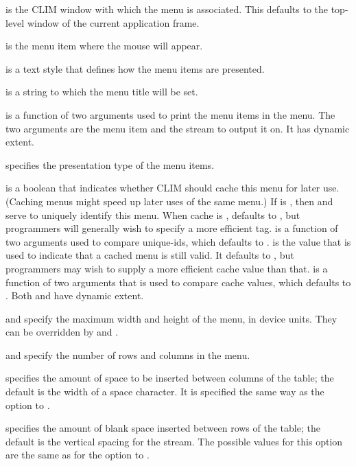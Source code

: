  is the CLIM window with which the menu is associated.
This defaults to the top-level window of the current application frame.

 is the menu item where the mouse will appear.

 is a text style that defines how the menu items are
presented.

 is a string to which the menu title will be set.

 is a function of two arguments used to print the menu items in the
menu.  The two arguments are the menu item and the stream to output it on.  It
has dynamic extent.

 specifies the presentation type of the menu items. 

 is a boolean that indicates whether CLIM should cache this menu for
later use.  (Caching menus might speed up later uses of the same menu.)  If
 is , then  and  serve to
uniquely identify this menu.  When cache is , 
defaults to , but programmers will generally wish to specify a more
efficient tag.   is a function of two arguments used to compare
unique-ids, which defaults to .   is the value that
is used to indicate that a cached menu is still valid.  It defaults to
, but programmers may wish to supply a more efficient cache value
than that.   is a function of two arguments that is used to
compare cache values, which defaults to .  Both  and
 have dynamic extent.

 and  specify the maximum width and height of the
menu, in device units.  They can be overridden by  and
.

 and  specify the number of rows and columns in the
menu.

 specifies the amount of space to be inserted between columns of
the table; the default is the width of a space character.  It is specified the
same way as the  option to .

 specifies the amount of blank space inserted between rows of the
table; the default is the vertical spacing for the stream.  The possible values
for this option are the same as for the  option to
.

